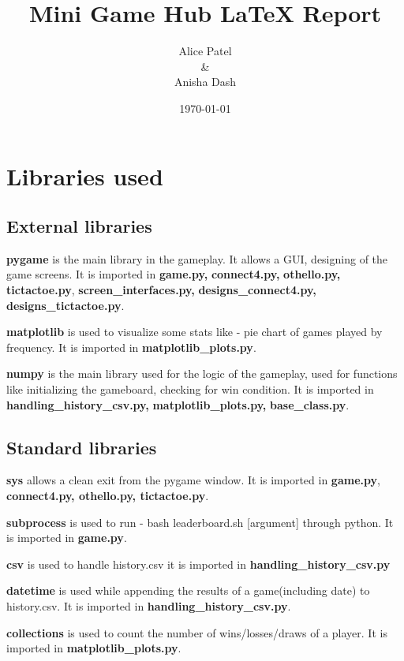 \documentclass[12pt]{article}
\title{Mini Game Hub \LaTeX{}  Report}
\author{Alice Patel \\
\& \\
Anisha Dash }
\date{\today}
\begin{document}
\maketitle

\tableofcontents

\section{Libraries used}

\subsection{External libraries}

\textbf{pygame} is the main library in the gameplay. It allows a GUI, designing of the game screens. 
It is imported in \textbf{game.py,} \textbf{connect4.py,} \textbf{othello.py,} \textbf{tictactoe.py}, \textbf{screen\_interfaces.py,} \textbf{designs\_connect4.py,} \textbf{designs\_tictactoe.py}. 

\noindent \textbf{matplotlib} is used to visualize some stats like - pie chart of games played by frequency.
It is imported in \textbf{matplotlib\_plots.py}.

\noindent \textbf{numpy} is the main library used for the logic of the gameplay, used for functions like initializing the gameboard, checking for win condition.
It is imported in \textbf{handling\_history\_csv.py,} \textbf{matplotlib\_plots.py,} \textbf{base\_class.py}. 

\subsection{Standard libraries}

\textbf{sys} allows a clean exit from the pygame window.
It is imported in \textbf{game.py}, \textbf{connect4.py, othello.py, tictactoe.py}.

\noindent \textbf{subprocess} is used to run - bash leaderboard.sh [argument] through python. 
It is imported in \textbf{game.py}.

\noindent \textbf{csv} is used to handle history.csv
it is imported in \textbf{handling\_history\_csv.py}

\noindent \textbf{datetime} is used while appending the results of a game(including date) to history.csv. 
It is imported in  \textbf{handling\_history\_csv.py}.

\noindent \textbf{collections} is used to count the number of wins/losses/draws of a player.
It is imported in  \textbf{matplotlib\_plots.py}.
\end{document}
